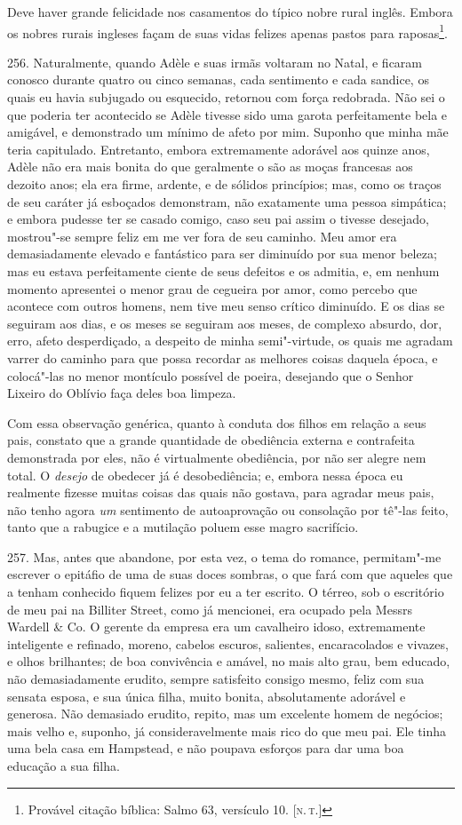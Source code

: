Deve haver grande felicidade nos casamentos do típico nobre rural
inglês. Embora os nobres rurais ingleses façam de suas vidas felizes
apenas pastos para raposas\footnote{Provável citação bíblica: Salmo 63,
  versículo 10. {[}\textsc{n.\,t.}{]}}.

256. Naturalmente, quando Adèle e suas irmãs voltaram no Natal, e
ficaram conosco durante quatro ou cinco semanas, cada sentimento e cada
sandice, os quais eu havia subjugado ou esquecido, retornou com força
redobrada. Não sei o que poderia ter acontecido se Adèle tivesse sido
uma garota perfeitamente bela e amigável, e demonstrado um mínimo de
afeto por mim. Suponho que minha mãe teria capitulado. Entretanto,
embora extremamente adorável aos quinze anos, Adèle não era mais bonita
do que geralmente o são as moças francesas aos dezoito anos; ela era
firme, ardente, e de sólidos princípios; mas, como os traços de seu
caráter já esboçados demonstram, não exatamente uma pessoa simpática; e
embora pudesse ter se casado comigo, caso seu pai assim o tivesse
desejado, mostrou"-se sempre feliz em me ver fora de seu caminho. Meu
amor era demasiadamente elevado e fantástico para ser diminuído por sua
menor beleza; mas eu estava perfeitamente ciente de seus defeitos e os
admitia, e, em nenhum momento apresentei o menor grau de cegueira por
amor, como percebo que acontece com outros homens, nem tive meu senso
crítico diminuído. E os dias se seguiram aos dias, e os meses se
seguiram aos meses, de complexo absurdo, dor, erro, afeto desperdiçado,
a despeito de minha semi"-virtude, os quais me agradam varrer do caminho
para que possa recordar as melhores coisas daquela época, e colocá"-las
no menor montículo possível de poeira, desejando que o Senhor Lixeiro do
Oblívio faça deles boa limpeza.

Com essa observação genérica, quanto à conduta dos filhos em relação a
seus pais, constato que a grande quantidade de obediência externa e
contrafeita demonstrada por eles, não é virtualmente obediência, por não
ser alegre nem total. O \emph{desejo} de obedecer já é desobediência; e,
embora nessa época eu realmente fizesse muitas coisas das quais não
gostava, para agradar meus pais, não tenho agora \emph{um} sentimento de
autoaprovação ou consolação por tê"-las feito, tanto que a rabugice e a
mutilação poluem esse magro sacrifício.

257. Mas, antes que abandone, por esta vez, o tema do romance,
permitam"-me escrever o epitáfio de uma de suas doces sombras, o que fará
com que aqueles que a tenham conhecido fiquem felizes por eu a ter
escrito. O térreo, sob o escritório de meu pai na Billiter Street, como
já mencionei, era ocupado pela Messrs Wardell \& Co. O gerente da
empresa era um cavalheiro idoso, extremamente inteligente e refinado,
moreno, cabelos escuros, salientes, encaracolados e vivazes, e olhos
brilhantes; de boa convivência e amável, no mais alto grau, bem educado,
não demasiadamente erudito, sempre satisfeito consigo mesmo, feliz com
sua sensata esposa, e sua única filha, muito bonita, absolutamente
adorável e generosa. Não demasiado erudito, repito, mas um excelente
homem de negócios; mais velho e, suponho, já consideravelmente mais rico
do que meu pai. Ele tinha uma bela casa em Hampstead, e não poupava
esforços para dar uma boa educação a sua filha.


